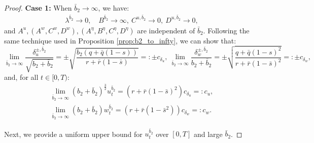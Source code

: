 \documentclass[11pt]{article}
\begin{document}
\begin{proof}
	\textbf{Case 1:} When $\bar{b}_2 \to \infty$,  we have:
	\begin{equation*}
	\begin{array}{l}
	\lambda^{\bar{b}_2} \to 0, \quad B^{\bar{b}_2} \to \infty,\ C^{u,\bar{b}_2} \to 0,\ D^{u,\bar{b}_2} \to 0,
	\end{array}
	\end{equation*}
	and $A^{u}, (A^w,C^w,D^w), (A^\eta, B^\eta, C^\eta, D^\eta)$ are independent of $\bar{b}_2$.
	Following the same technique used in Proposition \ref{prop:b2_to_infty}, we can show that:
	$$ \lim_{\bar{b}_2 \to \infty} \frac{\delta^{\pm,\bar{b}_2}_u}{\sqrt{b_2 + \bar{b}_2}} =\pm \sqrt{ \frac{b_2 (q + \bar{q}(1-s))}{r + \bar{r}(1-\bar{s})} } =: \pm c_{\delta_u},
	\
	\lim_{\bar{b}_2 \to \infty} \frac{\delta^{\pm, \bar{b}_2}_w}{b_2 + \bar{b}_2} = \pm \sqrt{\frac{q+\bar{q}(1-s)^2}{r+ \bar{r}(1-\bar{s})^2}} =: \pm c_{\delta_w},$$
	and, for all $t \in [0,T)$:
	\begin{equation*}
	\begin{array}{l}
	\lim_{\bar{b}_2 \to \infty}(b_2 + \bar{b}_2)^{\frac{3}{2}} u^{\bar{b}_2}_t = (r + \bar{r}(1-\bar{s})^2) c_{\delta_u} =: c_u, \\
	\lim_{\bar{b}_2 \to \infty}(b_2 + \bar{b}_2) w_t^{\bar{b}_2} = (r + \bar{r}(1-\bar{s}^2) ) c_{\delta_w} =: c_w.
	\end{array}
	\end{equation*}
	
	Next, we provide a uniform upper bound for $u_t^{\bar{b}_2}$ over $[0,T]$ and large $\bar{b}_2$.
	

\end{proof}
\end{document}
